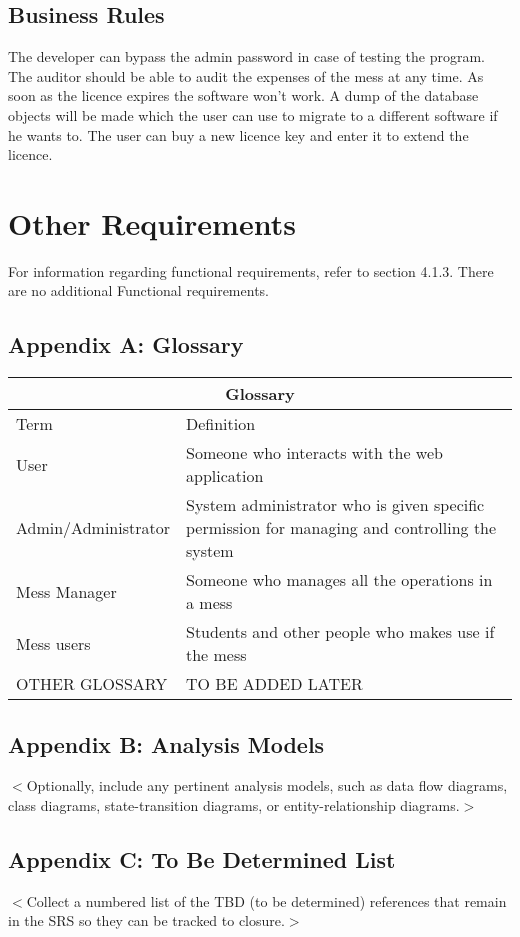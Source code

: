 \documentclass{scrreprt}
\begin{document}
\section{Business Rules}
The developer can bypass the admin password in case of testing the program.
The auditor should be able to audit the expenses of the mess at any time.
As soon as the licence expires the software won't work. A dump of the database objects will be made which the user can use to migrate to a different software if he wants to. The user can buy a new licence key and enter it to extend the licence.


\chapter{Other Requirements}
For information regarding functional requirements, refer to section 4.1.3. There  are  no  additional  Functional 
requirements.

\section{Appendix A: Glossary}


\begin{tabular}{ |p{4cm}||p{12cm}| }
 \hline
 \multicolumn{2}{|c|}{Glossary} \\
 \hline
 Term & Definition\\
 \hline
 User  & Someone who interacts with the web application  \\
 Admin/Administrator&  System administrator who is given specific permission for managing and 
controlling the system  \\
 Mess Manager & Someone who manages all the operations in a mess  \\
 Mess users & Students and other people who makes use if the mess  \\
 OTHER GLOSSARY  & TO BE ADDED LATER\\

 \hline
\end{tabular}
\section{Appendix B: Analysis Models}
$<$Optionally, include any pertinent analysis models, such as data flow 
diagrams, class diagrams, state-transition diagrams, or entity-relationship 
diagrams.$>$

\section{Appendix C: To Be Determined List}
$<$Collect a numbered list of the TBD (to be determined) references that remain 
in the SRS so they can be tracked to closure.$>$
\end{document}
